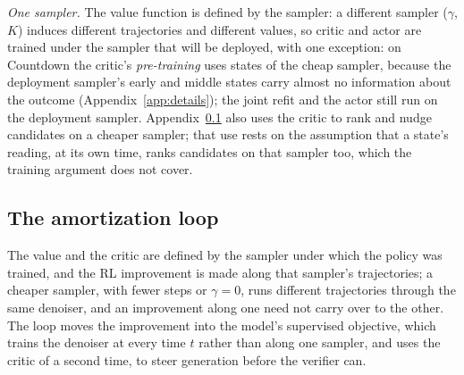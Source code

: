 \emph{One sampler.} The value function is defined by the sampler: a different sampler ($\gamma$, $K$) induces different trajectories and different values, so critic and actor are trained under the sampler that will be deployed, with one exception: on Countdown the critic's \emph{pre-training} uses states of the cheap sampler, because the deployment sampler's early and middle states carry almost no information about the outcome (Appendix~\ref{app:details}); the joint refit and the actor still run on the deployment sampler. Appendix~\ref{app:loop} also uses the critic to rank and nudge candidates on a cheaper sampler; that use rests on the assumption that a state's reading, at its own time, ranks candidates on that sampler too, which the training argument does not cover.

\subsection{The amortization loop}
\label{app:loop}
The value and the critic are defined by the sampler under which the policy was trained, and the RL improvement is made along that sampler's trajectories; a cheaper sampler, with fewer steps or $\gamma=0$, runs different trajectories through the same denoiser, and an improvement along one need not carry over to the other. The loop moves the improvement into the model's supervised objective, which trains the denoiser at every time $t$ rather than along one sampler, and uses the critic of \methodSVGTwoD{} a second time, to steer generation before the verifier can.

